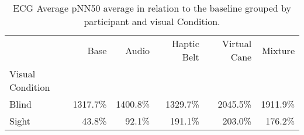 
\begin{table}[!htb]
\centering
\caption{ECG Average pNN50 average in relation to the baseline grouped by participant and visual Condition.}
\label{tab:ecg_pnn50_average_group}
\begin{tabular}{lrrrrr}
\toprule
{} &      Base &     Audio & Haptic Belt & Virtual Cane &   Mixture \\
Visual Condition &           &           &             &              &           \\
\midrule
Blind            &  1317.7\% &  1400.8\% &    1329.7\% &     2045.5\% &  1911.9\% \\
Sight            &    43.8\% &    92.1\% &     191.1\% &      203.0\% &   176.2\% \\
\bottomrule
\end{tabular}
\end{table}

